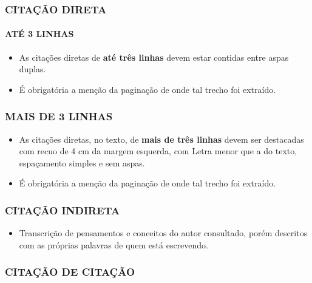 \documentclass[
]{book}
\providecommand{\tightlist}{%
  \setlength{\itemsep}{0pt}\setlength{\parskip}{0pt}}
\begin{document}
\hypertarget{citauxe7uxe3o-direta}{%
\subsubsection{CITAÇÃO DIRETA}\label{citauxe7uxe3o-direta}}

\hypertarget{atuxe9-3-linhas}{%
\paragraph{ATÉ 3 LINHAS}\label{atuxe9-3-linhas}}

\begin{itemize}
\tightlist
\item
  As citações diretas de \textbf{até três linhas} devem estar contidas entre aspas duplas.
\item
  É obrigatória a menção da paginação de onde tal trecho foi extraído.
\end{itemize}

\hypertarget{mais-de-3-linhas}{%
\subsubsection{MAIS DE 3 LINHAS}\label{mais-de-3-linhas}}

\begin{itemize}
\tightlist
\item
  As citações diretas, no texto, de \textbf{mais de três linhas} devem ser destacadas com recuo de 4 cm da margem esquerda, com Letra menor que a do texto, espaçamento simples e sem aspas.
\item
  É obrigatória a menção da paginação de onde tal trecho foi extraído.
\end{itemize}

\hypertarget{citauxe7uxe3o-indireta}{%
\subsubsection{CITAÇÃO INDIRETA}\label{citauxe7uxe3o-indireta}}

\begin{itemize}
\tightlist
\item
  Transcrição de pensamentos e conceitos do autor consultado, porém descritos com as próprias palavras de quem está escrevendo.
\end{itemize}

\hypertarget{citauxe7uxe3o-de-citauxe7uxe3o}{%
\subsubsection{CITAÇÃO DE CITAÇÃO}\label{citauxe7uxe3o-de-citauxe7uxe3o}}
\end{document}
